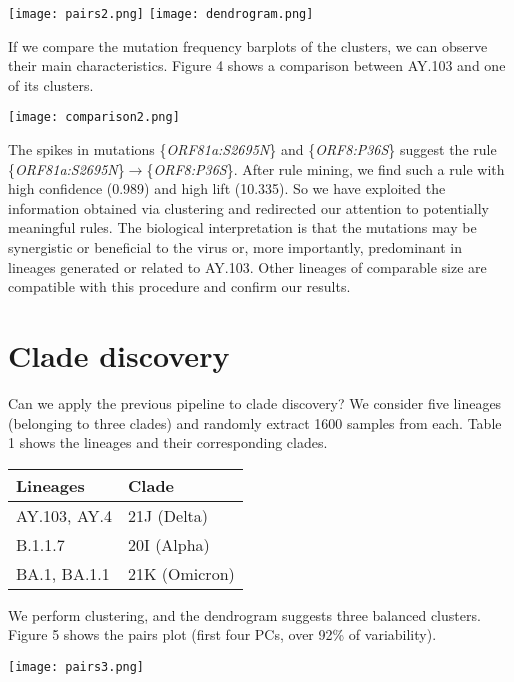 \documentclass[a0,landscape]{a0poster}
\begin{document}
\begin{multicols}{4}
\begin{center}\vspace{1cm}
	\texttt{[image: pairs2.png]}
	\texttt{[image: dendrogram.png]}
\end{center}\vspace{1cm}
If we compare the mutation frequency barplots of the clusters, we can observe their main characteristics. Figure 4 shows a comparison between AY.103 and one of its clusters. 
\begin{center}\vspace{1cm}
	\texttt{[image: comparison2.png]}
\end{center}\vspace{1cm}
The spikes in mutations \{\textit{ORF81a:S2695N}\} and \{\textit{ORF8:P36S}\} suggest the rule \{\textit{ORF81a:S2695N}\}$\rightarrow$\{\textit{ORF8:P36S}\}.  After rule mining, we find such a rule with high confidence (0.989) and high lift (10.335). So we have exploited the information obtained via clustering and redirected our attention to potentially meaningful rules. The biological interpretation is that the mutations may be synergistic or beneficial to the virus or, more importantly, predominant in lineages generated or related to AY.103. Other lineages of comparable size are compatible with this procedure and confirm our results.
\section*{Clade discovery}
Can we apply the previous pipeline to clade discovery? We consider five lineages (belonging to three clades) and randomly extract 1600 samples from each. Table 1 shows the lineages and their corresponding clades.
\begin{center}\vspace{1cm}
		\renewcommand{\arraystretch}{1.2} %
	\begin{tabular}{l l }
		\toprule
		\textbf{Lineages} & \textbf{Clade} \\
		\midrule
		AY.103, AY.4 & 21J (Delta)\\
		B.1.1.7 & 20I (Alpha) \\
		BA.1, BA.1.1 & 21K (Omicron) \\
		\bottomrule
	\end{tabular}
\end{center}\vspace{1cm}
 We perform clustering, and the dendrogram suggests three balanced clusters. Figure 5 shows the pairs plot (first four PCs, over 92\% of variability).
\begin{center}\vspace{1cm}
	\texttt{[image: pairs3.png]}
\end{center}\vspace{1cm}


\end{multicols}
\end{document}
